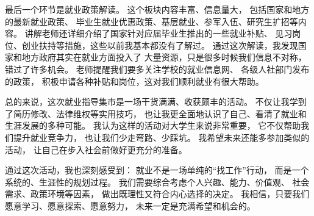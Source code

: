 \documentclass[UTF8]{ctexart}
\begin{document}
最后一个环节是就业政策解读。
这个板块内容丰富、信息量大，
包括国家和地方的最新就业政策、
毕业生就业优惠政策、基层就业、参军入伍、研究生扩招等内容。
讲解老师还详细介绍了国家针对应届毕业生推出的一些就业补贴、
见习岗位、创业扶持等措施，这些以前我基本都没有了解过。
通过这次解读，我发现国家和地方政府其实在就业方面投入了
大量资源，只是很多时候我们信息不对称，错过了许多机会。
老师提醒我们要多关注学校的就业信息网、
各级人社部门发布的政策，
积极申请各种补贴和岗位，这对我们顺利就业有很大帮助。

总的来说，这次就业指导集市是一场干货满满、收获颇丰的活动。
不仅让我学到了简历修改、法律维权等实用技巧，
也让我更全面地认识了自己、看清了就业和生涯发展的多种可能。
我认为这样的活动对大学生来说非常重要，
它不仅帮助我们提升就业竞争力，
也让我们少走弯路、少踩坑。
我希望未来还能多参加类似的活动，
让自己在步入社会前做好更充分的准备。

通过这次活动，我也深刻感受到：
就业不是一场单纯的“找工作”行动，
而是一个系统的、生涯性的规划过程。
我们需要综合考虑个人兴趣、能力、价值观、
社会需求、政策环境等因素，
做出既理性又符合内心选择的决定。
我相信，只要我们愿意学习、愿意探索、愿意努力，
未来一定是充满希望和机会的。
\end{document}
